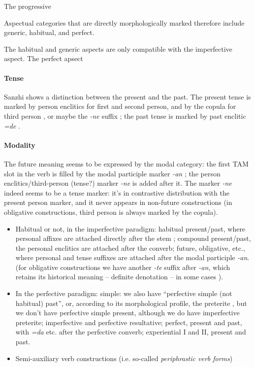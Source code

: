 \documentclass[a4paper, oneside, 12pt]{report}
\newcommand*{\citesec}[1]{\S~{#1}}
\newcommand*{\citepage}[1]{p.~{#1}}
\newcommand*{\citepages}[1]{pp.~{#1}}
\newcommand*{\term}[1]{\emph{#1}}
\newcommand{\form}[1]{\emph{#1}}
\begin{document}
The progressive

Aspectual categories that are directly morphologically marked therefore 
include generic, habitual, and perfect.

The habitual and generic aspects are only compatible with the imperfective aspect.
The perfect apsect 

\paragraph*{Tense} Sanzhi shows a distinction between the present and the past.
The present tense is marked by 
person enclitics for first and second person, 
and by the copula for third person \citep[\citepage{250}]{forker2020grammar},
or maybe the \form{-ne} suffix \citep[\citepage{253}]{forker2020grammar};
the past tense is marked by past enclitic \form{=de} \citep[\citepage{252}]{forker2020grammar}.

\paragraph*{Modality} 
The future meaning seems to be expressed by  
the modal category: the first TAM slot in the verb is filled by 
the modal participle marker \form{-an} \citep[\citepage{18.1.2.2}]{forker2020grammar};
the person enclitics/third-person (tense?) marker \form{-ne} is added after it.
The marker \form{-ne} indeed seems to be a tense marker: 
it's in contrastive distribution with the present person marker,
and it never appears in non-future constructions
(in obligative constructions, third person is always marked by the copula).

\begin{itemize}
    \item Habitual or not, in the imperfective paradigm: 
    habitual present/past, where personal affixes are attached  
    directly after the stem \citep[\citepages{243, 246}]{forker2020grammar};
    compound present/past, the personal enclitics are attached 
    after the converb; 
    future, obligative, etc., where personal and tense suffixes are attached 
    after the modal participle \form{-an}. 
    (for obligative constructions we have another \form{-te} suffix after \form{-an},
    which retains its historical meaning -- definite denotation -- 
    in some cases \citep[\citepage{256}]{forker2020grammar}).

    \item In the perfective paradigm:
    simple: we also have ``perfective simple (not habitual) past'', 
    or, according to its morphological profile, the preterite 
    \citep[\citesec{14.2.2}]{forker2020grammar},
    but we don't have perfective simple present,
    although we do have imperfective preterite;
    imperfective and perfective resultative; 
    perfect, present and past, with \form{=da} etc. after the perfective converb; 
    experiential I and II, present and past. 
    \item Semi-auxiliary verb constructions (i.e. so-called \term{periphrastic verb forms})
\end{itemize}
\end{document}
